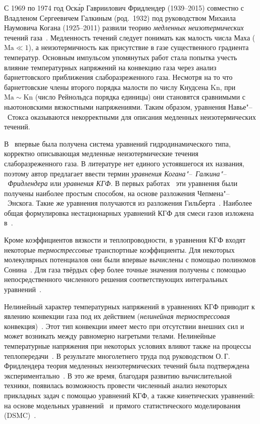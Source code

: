 \documentclass[
aps,%
12pt,%
final,%
notitlepage,%
oneside,%
onecolumn,%
nobibnotes,%
nofootinbib,%
superscriptaddress,%
noshowpacs,%
showkeys,%
floatfix,%
tightenlines,%
centertags]%
{revtex4}
\newcommand{\Kn}{\mathrm{Kn}}
\newcommand{\Ma}{\mathrm{Ma}}
\begin{document}
С 1969 по 1974 год Оск\'{а}р Гавриилович Фридлендер (1939--2015)
совместно с Владленом Сергеевичем Галкиным (род.~1932)
под руководством Михаила Наумовича Когана (1925--2011)
развили теорию \emph{медленных неизотермических}
течений газа~\cite{Kogan1970, Kogan1971, Friedlander1974, Galkin1974, Kogan1976}.
Медленность течений следует понимать как малость числа Маха (\(\Ma\ll1\)),
а неизотермичность как присутствие в газе существенного градиента температур.
Основным импульсом упомянутых работ стала попытка учесть влияние температурных напряжений
на конвекцию газа через анализ барнеттовского приближения слаборазреженного газа.
Несмотря на то что барнеттовские члены второго порядка малости по числу Кнудсена \(\Kn\),
при \(\Ma\sim\Kn\) (число Рейнольдса порядка единицы)
они становятся сравнимыми с ньютоновскими вязкостными напряжениями.
Таким образом, уравнения Навье"--~Стокса оказываются некорректными для
описания медленных неизотермических течений.

В~\cite{Kogan1970} впервые была получена система уравнений гидродинамического типа,
корректно описывающая медленные неизотермические течения слаборазреженного газа.
В литературе нет единого устоявшегося их названия,
поэтому автор предлагает ввести термин \emph{уравнения Когана"--~Галкина"--~Фридлендера}
или \emph{уравнения КГФ}.
В первых работах~\cite{Kogan1970, Kogan1971} эти уравнения были получены наиболее простым способом,
на основе разложения Чепмена"--~Энскога. Такие же уравнения получаются из разложения Гильберта~\cite{Galkin1974}.
Наиболее общая формулировка нестационарных уравнений КГФ для смеси газов изложена в~\cite{Galkin2015}.

Кроме коэффициентов вязкости и теплопроводности, в уравнения КГФ входят некоторые
\emph{термострессовые} транспортные коэффициенты. Для некоторых молекулярных потенциалов они
были впервые вычислены с помощью полиномов Сонина~\cite{Burnett1935, Chapman1960}.
Для газа твёрдых сфер более точные значения получены с помощью
непосредственного численного решения соответствующих интегральных уравнений~\cite{Sone1996, Sone2002, Sone2007}.

Нелинейный характер температурных напряжений в уравнениях КГФ приводит к
явлению конвекции газа под их действием (\emph{нелинейная термострессовая} конвекция)~\cite{Kogan1971}.
Этот тип конвекции имеет место при отсутствии внешних сил и может возникать между равномерно нагретыми телами.
Нелинейные температурные напряжения при некоторых условиях влияют также на процессы теплопередачи~\cite{Friedlander1978}.
В результате многолетнего труда под руководством О.\,Г. Фридлендера теория медленных неизотермических течений
была подтверждена экспериментально~\cite{Friedlander1997, Friedlander2003}.
В это же время, благодаря развитию вычислительной техники, появилась возможность провести численный анализ
некоторых прикладных задач с помощью уравнений КГФ, а также кинетических уравнений:
на основе модельных уравнений~\cite{Alexandrov2002, Aoki2006, Alexandrov2008b, Alexandrov2011, Rykov2008}
и прямого статистического моделирования (DSMC)~\cite{Alexandrov2008a, Aoki2007}.
\end{document}
